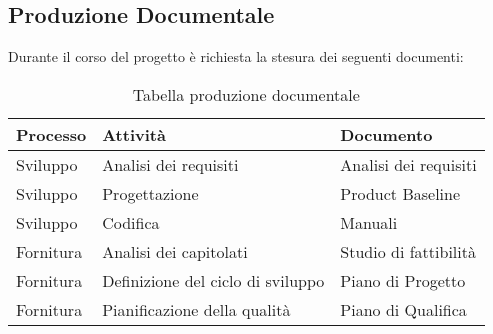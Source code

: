 \documentclass[../NormediProgetto.tex]{subfiles}
\begin{document}
\subsection{Produzione Documentale}
Durante il corso del progetto è richiesta la stesura dei seguenti documenti:
\begin{longtable}{| p{4cm} |p{5cm} | p{4cm} |}
	\caption {Tabella produzione documentale} \label{tab:title} \\
	\hline
	\textbf{Processo} & \textbf{Attività} & \textbf{Documento} \\
	\hline
	\endhead
	
	\newline Sviluppo &
	\newline Analisi dei requisiti &
	\newline Analisi dei requisiti \newline 
	\\[1em]
	
	\hline
	
	\newline Sviluppo &
	\newline Progettazione  &
	\newline Product Baseline \newline 
	\\[1em]
	
	\hline
	
	\newline Sviluppo &
	\newline Codifica &
	\newline Manuali\newline 
	\\[1em]
	
	\hline
	
	\newline Fornitura &
	\newline Analisi dei capitolati &
	\newline Studio di fattibilità \newline 
	\\[1em]
	
	\hline
	
	\newline Fornitura &
	\newline Definizione del ciclo di sviluppo &
	\newline Piano di Progetto \newline 
	\\[1em]
	
	\hline
	
	\newline Fornitura &
	\newline Pianificazione della qualità &
	\newline Piano di Qualifica \newline 
	\\[1em]
	

\end{longtable}
\end{document}
